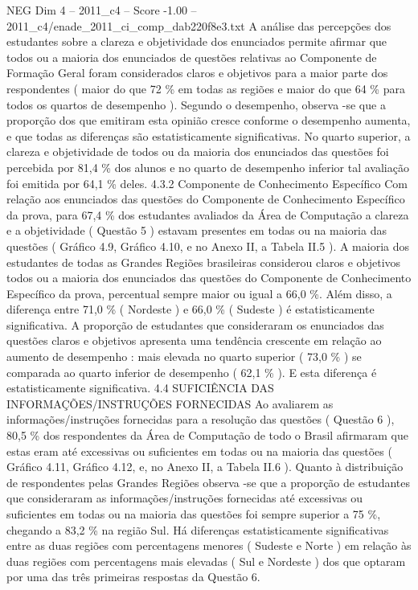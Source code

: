 \begin{textsample}{NEG Dim 4 – 2011\_c4 – Score -1.00 – 2011\_c4/enade\_2011\_ci\_comp\_dab220f8e3.txt}
A análise das percepções dos estudantes sobre a clareza e objetividade dos enunciados permite afirmar que todos ou a maioria dos enunciados de questões relativas ao Componente de Formação Geral foram considerados claros e objetivos para a maior parte dos respondentes ( maior do que 72 \% em todas as regiões e maior do que 64 \% para todos os quartos de desempenho ).
Segundo o desempenho, observa -se que a proporção dos que emitiram esta opinião cresce conforme o desempenho aumenta, e que todas as diferenças são estatisticamente significativas.
No quarto superior, a clareza e objetividade de todos ou da maioria dos enunciados das questões foi percebida por 81,4 \% dos alunos e no quarto de desempenho inferior tal avaliação foi emitida por 64,1 \% deles. 4.3.2 Componente de Conhecimento Específico Com relação aos enunciados das questões do Componente de Conhecimento Específico da prova, para 67,4 \% dos estudantes avaliados da Área de Computação a clareza e a objetividade ( Questão 5 ) estavam presentes em todas ou na maioria das questões ( Gráfico 4.9, Gráfico 4.10, e no Anexo II, a Tabela II.5 ).
A maioria dos estudantes de todas as Grandes Regiões brasileiras considerou claros e objetivos todos ou a maioria dos enunciados das questões do Componente de Conhecimento Específico da prova, percentual sempre maior ou igual a 66,0 \%.
Além disso, a diferença entre 71,0 \% ( Nordeste ) e 66,0 \% ( Sudeste ) é estatisticamente significativa.
A proporção de estudantes que consideraram os enunciados das questões claros e objetivos apresenta uma tendência crescente em relação ao aumento de desempenho : mais elevada no quarto superior ( 73,0 \% ) se comparada ao quarto inferior de desempenho ( 62,1 \% ).
E esta diferença é estatisticamente significativa. 4.4 SUFICIÊNCIA DAS INFORMAÇÕES/INSTRUÇÕES FORNECIDAS Ao avaliarem as informações/instruções fornecidas para a resolução das questões ( Questão 6 ), 80,5 \% dos respondentes da Área de Computação de todo o Brasil afirmaram que estas eram até excessivas ou suficientes em todas ou na maioria das questões ( Gráfico 4.11, Gráfico 4.12, e, no Anexo II, a Tabela II.6 ).
Quanto à distribuição de respondentes pelas Grandes Regiões observa -se que a proporção de estudantes que consideraram as informações/instruções fornecidas até excessivas ou suficientes em todas ou na maioria das questões foi sempre superior a 75 \%, chegando a 83,2 \% na região Sul.
Há diferenças estatisticamente significativas entre as duas regiões com percentagens menores ( Sudeste e Norte ) em relação às duas regiões com percentagens mais elevadas ( Sul e Nordeste ) dos que optaram por uma das três primeiras respostas da Questão 6.

\end{textsample}
